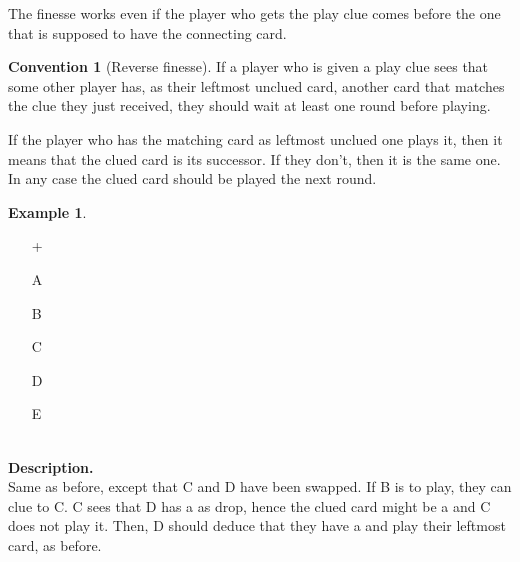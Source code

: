 \documentclass[a4paper]{article}
\theoremstyle{plain}
\theoremstyle{definition}
\newtheorem{example}[theorem]{Example}
\newtheorem{convention}[theorem]{Convention}
\begin{document}
The finesse works even if the player who gets the play clue comes before the one that is supposed to have the connecting card. 

\begin{convention}[Reverse finesse]
	If a player who is given a play clue sees that some other player has, as their leftmost unclued card, another card that matches the clue they just received, they should wait at least one round before playing.
\end{convention}

If the player who has the matching card as leftmost unclued one plays it, then it means that the clued card is its successor. If they don't, then it is the same one. In any case the clued card should be played the next round.

\begin{example} \hfill \\
	\begin{minipage}{0.45\textwidth}
		\begin{itemize}
			\item[\Large +]      
			\item[\Large A]    
			\item[\Large B]    
			\item[\Large C]    
			\item[\Large D]    
			\item[\Large E]    
		\end{itemize}
	\end{minipage}%
	\begin{minipage}{0.55\textwidth}
		\hfill \\
		
		\textbf{Description.} \\
		
		Same as before, except that C and D have been swapped. If B is to play, they can clue  to C. C sees that D has a  as drop, hence the clued card might be a  and C does not play it. Then, D should deduce that they have a  and play their leftmost card, as before.
	\end{minipage}
\end{example} \vspace{0.15 cm}
\end{document}
